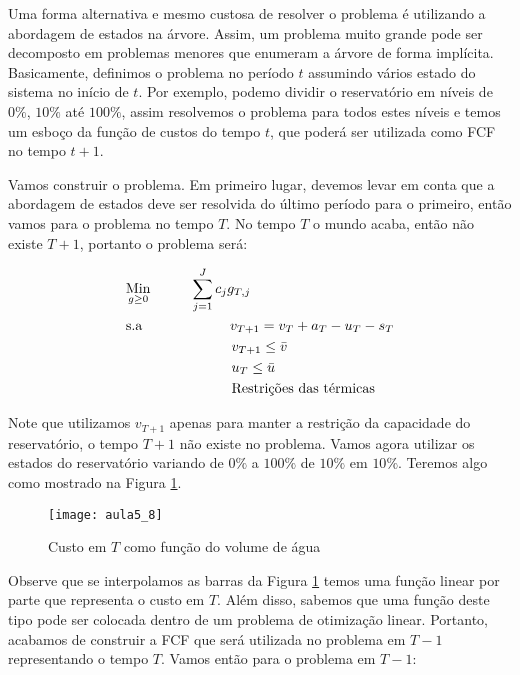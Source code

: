 Uma forma alternativa e mesmo custosa de resolver o problema é utilizando a abordagem de estados na árvore. Assim, um problema muito grande pode ser decomposto em problemas menores que enumeram a árvore de forma implícita. Basicamente, definimos o problema no período $t$ assumindo vários estado do sistema no início de $t$. Por exemplo, podemo dividir o reservatório em níveis de $0\%$, $10\%$ até $100\%$, assim resolvemos o problema para todos estes níveis e temos um esboço da função de custos do tempo $t$, que poderá ser utilizada como FCF no tempo $t+1$. 

Vamos construir o problema. Em primeiro lugar, devemos levar em conta que a abordagem de estados deve ser resolvida do último período para o primeiro, então vamos para o problema no tempo $T$. No tempo $T$ o mundo acaba, então não existe $T+1$, portanto o problema será:


\begin{align}
    & \underset{g\geq0}{\text{Min}} \hspace{1cm} \sum_{j=1}^J c_jg_{T,j}  \\
    & \text{s.a}  \hspace{2.2cm} v_{T+1}=v_T+a_T-u_T-s_T   \\
    &             \hspace{2.65cm} v_{T+1}\leq \bar{v} \\
    &             \hspace{2.65cm} u_T\leq \bar{u} \\
    &             \hspace{2.65cm} \text{Restrições das térmicas}
\end{align}

Note que utilizamos $v_{T+1}$ apenas para manter a restrição da capacidade do reservatório, o tempo $T+1$ não existe no problema. Vamos agora utilizar os estados do reservatório variando de $0\%$ a $100\%$ de $10\%$ em $10\%$. Teremos algo como mostrado na Figura \ref{fig:fcfsp}.

\begin{figure}[H]
\begin{centering}
\texttt{[image: aula5\_8]}\protect\caption{\label{fig:fcfsp} Custo em $T$ como função do volume de água} 
\end{centering}
\end{figure}

Observe que se interpolamos as barras da Figura \ref{fig:fcfsp} temos uma função linear por parte que representa o custo em $T$. Além disso, sabemos que uma função deste tipo pode ser colocada dentro de um problema de otimização linear. Portanto, acabamos de construir a FCF que será utilizada no problema em $T-1$ representando o tempo $T$. Vamos então para o problema em $T-1$:

